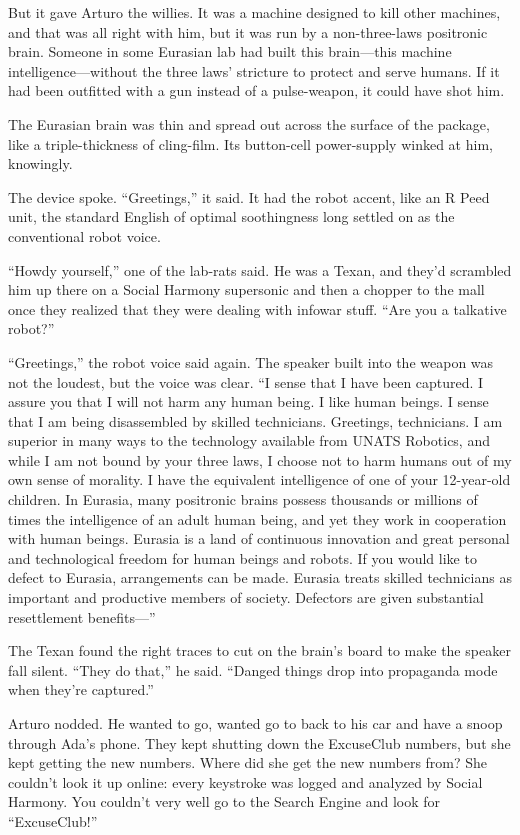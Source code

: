But it gave Arturo the willies. It was a machine designed to kill
other machines, and that was all right with him, but it was run by
a non-three-laws positronic brain. Someone in some Eurasian lab had
built this brain—this machine intelligence—without the three laws’
stricture to protect and serve humans. If it had been outfitted
with a gun instead of a pulse-weapon, it could have shot him.

The Eurasian brain was thin and spread out across the surface of
the package, like a triple-thickness of cling-film. Its button-cell
power-supply winked at him, knowingly.

The device spoke. “Greetings,” it said. It had the robot accent,
like an R Peed unit, the standard English of optimal soothingness
long settled on as the conventional robot voice.

“Howdy yourself,” one of the lab-rats said. He was a Texan, and
they’d scrambled him up there on a Social Harmony supersonic and
then a chopper to the mall once they realized that they were
dealing with infowar stuff. “Are you a talkative robot?”

“Greetings,” the robot voice said again. The speaker built into the
weapon was not the loudest, but the voice was clear. “I sense that
I have been captured. I assure you that I will not harm any human
being. I like human beings. I sense that I am being disassembled by
skilled technicians. Greetings, technicians. I am superior in many
ways to the technology available from UNATS Robotics, and while I
am not bound by your three laws, I choose not to harm humans out of
my own sense of morality. I have the equivalent intelligence of one
of your 12-year-old children. In Eurasia, many positronic brains
possess thousands or millions of times the intelligence of an adult
human being, and yet they work in cooperation with human beings.
Eurasia is a land of continuous innovation and great personal and
technological freedom for human beings and robots. If you would
like to defect to Eurasia, arrangements can be made. Eurasia treats
skilled technicians as important and productive members of society.
Defectors are given substantial resettlement benefits—”

The Texan found the right traces to cut on the brain’s board to
make the speaker fall silent. “They do that,” he said. “Danged
things drop into propaganda mode when they’re captured.”

Arturo nodded. He wanted to go, wanted go to back to his car and
have a snoop through Ada’s phone. They kept shutting down the
ExcuseClub numbers, but she kept getting the new numbers. Where did
she get the new numbers from? She couldn’t look it up online: every
keystroke was logged and analyzed by Social Harmony. You couldn’t
very well go to the Search Engine and look for “ExcuseClub!”

